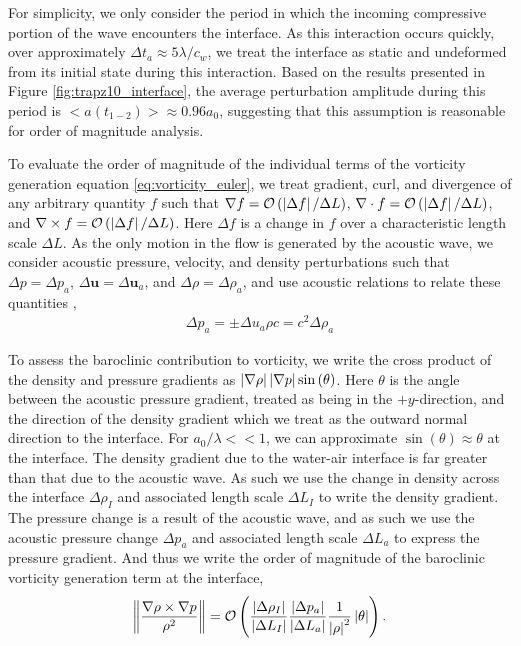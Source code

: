 For simplicity, we only consider the period in which the incoming
compressive portion of the wave encounters the interface. As this
interaction occurs quickly, over approximately
$\Delta t_a\approx5\lambda/c_{w}$, we treat the interface as static
and undeformed from its initial state during this interaction. Based
on the results presented in Figure \ref{fig:trapz10_interface}, the
average perturbation amplitude during this period is
$<a(t_{1-2})>\approx0.96a_0$, suggesting that this assumption is
reasonable for order of magnitude analysis.

To evaluate the order of magnitude of the individual terms of the
vorticity generation equation \eqref{eq:vorticity_euler}, we treat
gradient, curl, and divergence of any arbitrary quantity $f$ such that
$\nabla f= \mathcal{O}\left(\left|\Delta f\right|/\Delta L\right)$,
$\nabla\cdot f=\mathcal{O}\left(\left|\Delta f\right|/\Delta L\right)$, and
$\nabla\times f=\mathcal{O}\left(\left|\Delta f\right|/\Delta L\right)$. Here
$\Delta f$ is a change in $f$ over a characteristic length scale
$\Delta L$. As the only motion in the flow is generated by the
acoustic wave, we consider acoustic pressure, velocity, and density
perturbations such that $\Delta p=\Delta p_a$,
$\Delta \boldsymbol{u}=\Delta \boldsymbol{u}_a$, and
$\Delta \rho=\Delta \rho_a$, and use acoustic relations to relate
these quantities \citep{Anderson1990},
\begin{align}%
  \label{eq:acoustic_relations}%
  \Delta p_a=\pm\Delta u_a \rho c=c^2\Delta \rho_a%
\end{align}

To assess the baroclinic contribution to vorticity, we write the cross
product of the density and pressure gradients as
$\left|\nabla \rho\right| \left|\nabla p\right| \sin{\left(\theta\right)}$. Here
$\theta$ is the angle between the acoustic pressure gradient, treated
as being in the $\plus y$-direction, and the direction of the density
gradient which we treat as the outward normal direction to the
interface. For $a_0/\lambda<<1$, we can approximate
$\sin{\left(\theta\right)}\approx\theta$ at the interface. The density
gradient due to the water-air interface is far greater than that due
to the acoustic wave. As such we use the change in density across the
interface $\Delta \rho_I$ and associated length scale $\Delta L_I$ to
write the density gradient. The pressure change is a result of the
acoustic wave, and as such we use the acoustic pressure change
$\Delta p_a$ and associated length scale $\Delta L_a$ to express the
pressure gradient. And thus we write the order of magnitude of the
baroclinic vorticity generation term at the interface,
\begin{align}
  \label{eq:baroclinic_vorticity}%
  \norm{\frac{\nabla\rho\times\nabla p}{\rho^2}} =%
  \orderof{\frac{\abs{\Delta \rho_I}}{\abs{\Delta L_I}}\frac{\abs{\Delta p_a}}{\abs{\Delta L_a}}\frac{1}{\abs{\rho}^2}\abs{\theta}}.%
\end{align}

